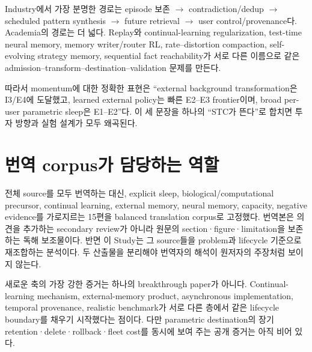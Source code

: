 Industry에서 가장 분명한 경로는 episode 보존 $\rightarrow$ contradiction/dedup $\rightarrow$
scheduled pattern synthesis $\rightarrow$ future retrieval $\rightarrow$ user control/provenance다.
Academia의 경로는 더 넓다. Replay와 continual-learning regularization, test-time neural memory,
memory writer/router RL, rate--distortion compaction, self-evolving strategy memory, sequential fact
reachability가 서로 다른 이름으로 같은 admission--transform--destination--validation 문제를 만든다.
\autocite{srcstc0020,srcstc0021,srcstc0035,srcstc0043,srcstc0051}

따라서 momentum에 대한 정확한 표현은 ``external background transformation은 I3/E4에 도달했고,
learned external policy는 빠른 E2--E3 frontier이며, broad per-user parametric sleep은 E1--E2''다.
이 세 문장을 하나의 ``STC가 뜬다''로 합치면 투자 방향과 실험 설계가 모두 왜곡된다.

\section{번역 corpus가 담당하는 역할}

전체 source를 모두 번역하는 대신, explicit sleep, biological/computational precursor, continual
learning, external memory, neural memory, capacity, negative evidence를 가로지르는 15편을 balanced
translation corpus로 고정했다. 번역본은 의견을 추가하는 secondary review가 아니라
원문의 section·figure·limitation을 보존하는 독해 보조물이다. 반면 이 Study는 그 source들을
problem과 lifecycle 기준으로 재조합하는 분석이다. 두 산출물을 분리해야 번역자의 해석이 원저자의
주장처럼 보이지 않는다.

\begin{keypoint}
새로운 축의 가장 강한 증거는 하나의 breakthrough paper가 아니다. Continual-learning mechanism,
external-memory product, asynchronous implementation, temporal provenance, realistic benchmark가 서로
다른 층에서 같은 lifecycle boundary를 채우기 시작했다는 점이다. 다만 parametric destination의
장기 retention·delete·rollback·fleet cost를 동시에 보여 주는 공개 증거는 아직 비어 있다.
\end{keypoint}
